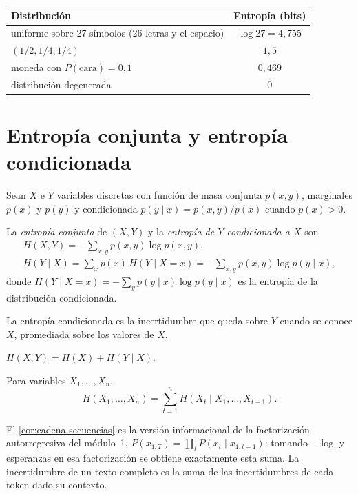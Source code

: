 \begin{center}
\begin{tabular}{@{}lc@{}}
\toprule
Distribución & Entropía (bits) \\
\midrule
uniforme sobre 27 símbolos (26 letras y el espacio) & $\log 27=4{,}755$ \\
$(1/2,1/4,1/4)$ & $1{,}5$ \\
moneda con $P(\text{cara})=0{,}1$ & $0{,}469$ \\
distribución degenerada & $0$ \\
\bottomrule
\end{tabular}
\end{center}

\section{Entropía conjunta y entropía condicionada}

Sean $X$ e $Y$ variables discretas con función de masa conjunta $p(x,y)$, marginales $p(x)$ y $p(y)$ y condicionada $p(y\mid x)=p(x,y)/p(x)$ cuando $p(x)>0$.

\begin{definicion}\label{def:conjunta}
La \emph{entropía conjunta} de $(X,Y)$ y la \emph{entropía de $Y$ condicionada a $X$} son
\begin{gather*}
H(X,Y)=-\sum_{x,y}p(x,y)\log p(x,y),\\
H(Y\mid X)=\sum_{x}p(x)\,H(Y\mid X=x)=-\sum_{x,y}p(x,y)\log p(y\mid x),
\end{gather*}
donde $H(Y\mid X=x)=-\sum_y p(y\mid x)\log p(y\mid x)$ es la entropía de la distribución condicionada.
\end{definicion}

La entropía condicionada es la incertidumbre que queda sobre $Y$ cuando se conoce $X$, promediada sobre los valores de $X$.

\begin{teorema}\label{teo:cadena-entropia}
$H(X,Y)=H(X)+H(Y\mid X)$.
\end{teorema}

\begin{corolario}\label{cor:cadena-secuencias}
Para variables $X_1,\dots,X_n$,
\[
H(X_1,\dots,X_n)=\sum_{t=1}^{n}H(X_t\mid X_1,\dots,X_{t-1}).
\]
\end{corolario}

El \cref{cor:cadena-secuencias} es la versión informacional de la factorización autorregresiva del módulo~1, $P(x_{1:T})=\prod_t P(x_t\mid x_{1:t-1})$: tomando $-\log$ y esperanzas en esa factorización se obtiene exactamente esta suma. La incertidumbre de un texto completo es la suma de las incertidumbres de cada token dado su contexto.

